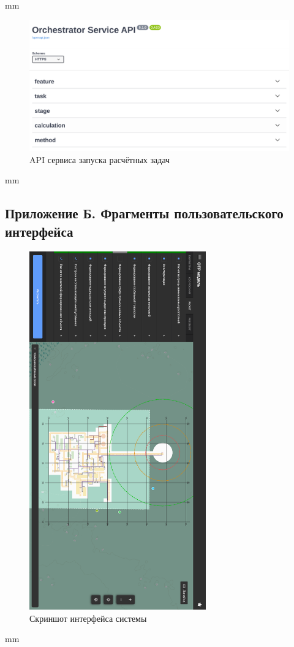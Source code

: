 mm
\begin{figure}[H]
	\includegraphics[width=\textwidth]{applications/pictures/orchestrator_swagger}
	\caption{API сервиса запуска расчётных задач}
	\label{pic:application__orchestrator-swagger}
\end{figure}
 mm


\subsection*{\large{Приложение Б. Фрагменты пользовательского интерфейса}}
\renewcommand{\thefigure}{\arabic{figure}}
\setcounter{figure}{0}

\begin{figure}[H]
	\includegraphics[width=0.68\textwidth]{applications/pictures/system}
	\caption{Скриншот интерфейса системы}
	\label{pic:application__system}
\end{figure}
 mm